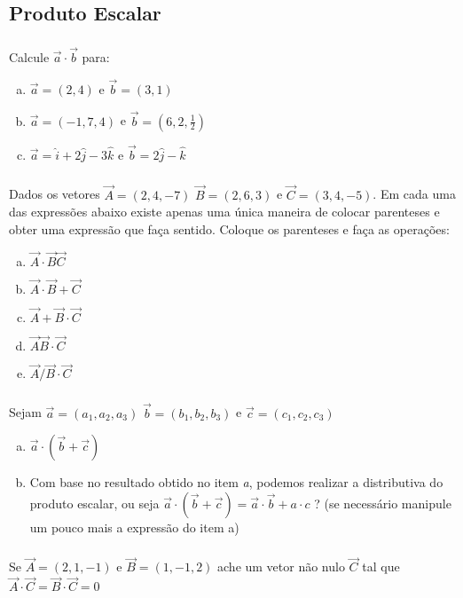 \documentclass[a4paper,10pt]{article}
\begin{document}
\subsection{Produto Escalar}

\subsubsection{}Calcule $\vec{a} \cdot \vec{b}$ para:

\begin{enumerate}[a)]
 \item $\vec{a}=(2,4)$ e $\vec{b}=(3,1)$
 \item $\vec{a}=(-1,7,4)$ e $\vec{b}=(6,2,\frac{1}{2})$
 \item $\vec{a}= \hat{i} + 2\hat{j} - 3\hat{k}$ e $\vec{b}= 2\hat{j} - \hat{k}$
\end{enumerate}


\subsubsection{}Dados os vetores $\vec{A}=(2,4,-7)$ $\vec{B}=(2,6,3)$ e $\vec{C}=(3,4,-5)$. 
Em cada uma das expressões abaixo existe apenas uma única maneira de colocar parenteses e obter uma
expressão que faça sentido. Coloque os parenteses e faça as operações: 


\begin{enumerate}[a)]
 \item $ \vec{A} \cdot \vec{B}       \vec{C}$
 \item $ \vec{A} \cdot \vec{B} +     \vec{C}$
 \item $ \vec{A} +     \vec{B} \cdot \vec{C}$
 \item $ \vec{A}       \vec{B} \cdot \vec{C}$
 \item $ \vec{A} /     \vec{B} \cdot \vec{C}$
\end{enumerate}

\subsubsection{}Sejam $\vec{a} = (a_1,a_2,a_3)$ $\vec{b} = (b_1,b_2,b_3)$ e $\vec{c} = (c_1,c_2,c_3)$ 

\begin{enumerate}[a)]
 \item $ \vec{a} \cdot (\vec{b}  +   \vec{c})$ 

 \item  Com base no resultado obtido no item \textit{a}, podemos realizar a distributiva do produto escalar, ou seja
 $ \vec{a} \cdot (\vec{b}  +   \vec{c}) = \vec{a} \cdot \vec{b} + a \cdot c $ ? (se necessário manipule um pouco mais a expressão do item a)
\end{enumerate}

 \subsubsection{}Se $\vec{A} = (2,1,-1)$ e $\vec{B} = (1,-1,2)$ ache um vetor não nulo $\vec{C}$  tal que 
 $\vec{A} \cdot \vec{C} = \vec{B} \cdot \vec{C} = 0$
 
 
 
\end{document}
